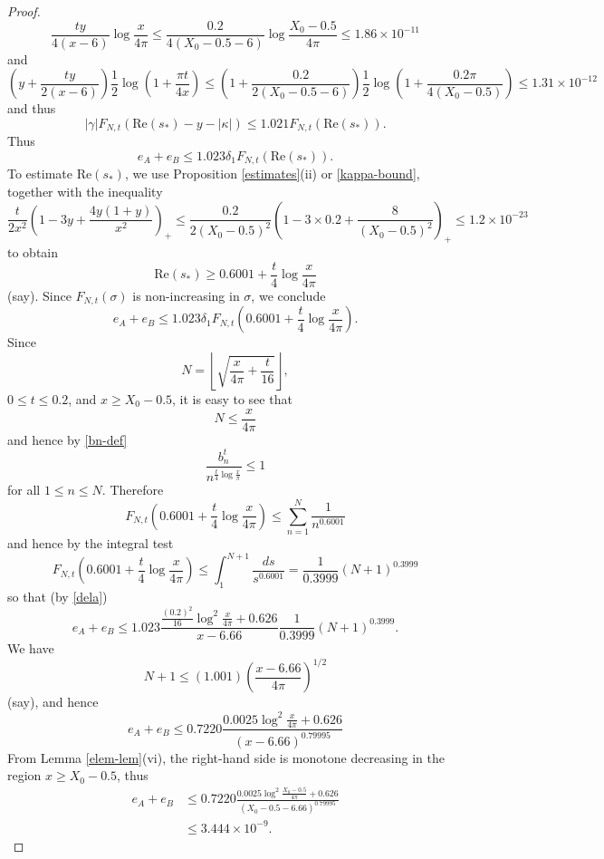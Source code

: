 \begin{proof}
$$ \frac{ty}{4(x-6)} \log \frac{x}{4\pi} \leq \frac{0.2}{4(X_0 - 0.5-6)}\log \frac{X_0 - 0.5}{4\pi} \leq 1.86 \times 10^{-11}$$
and
$$ (y + \frac{ty}{2(x-6)}) \frac{1}{2} \log(1 + \frac{\pi t}{4x}) \leq (1 + \frac{0.2}{2(X_0-0.5-6)}) \frac{1}{2} \log(1 + \frac{0.2 \pi}{4(X_0-0.5)}) \leq 1.31 \times 10^{-12}$$
and thus
\begin{equation}\label{gafn}
 |\gamma| F_{N,t}( \mathrm{Re}(s_*) - y - |\kappa| ) \leq 1.021  F_{N,t}( \mathrm{Re}(s_*) ).
\end{equation}
Thus
$$  e_A + e_B \leq 1.023 \delta_1 F_{N,t}( \mathrm{Re}(s_*) ).$$
To estimate $\mathrm{Re}(s_*)$, we use Proposition \ref{estimates}(ii) or \eqref{kappa-bound}, together with the inequality
$$ \frac{t}{2x^2} \left(1-3y+\frac{4y(1+y)}{x^2}\right)_+ \leq \frac{0.2}{2 (X_0-0.5)^2} \left(1 - 3 \times 0.2 + \frac{8}{(X_0-0.5)^2}\right)_+
\leq 1.2 \times 10^{-23}$$
to obtain 
$$ \mathrm{Re}(s_*) \geq 0.6001 + \frac{t}{4} \log \frac{x}{4\pi}$$
(say).  Since $F_{N,t}(\sigma)$ is non-increasing in $\sigma$, we conclude
$$  e_A + e_B \leq 1.023 \delta_1 F_{N,t}( 0.6001 + \frac{t}{4} \log \frac{x}{4\pi} ).$$
Since
$$ N = \left\lfloor \sqrt{\frac{x}{4\pi} + \frac{t}{16}} \right\rfloor,$$
$0 \leq t \leq 0.2$, and $x \geq X_0-0.5$, it is easy to see that
$$ N \leq \frac{x}{4\pi}$$
and hence by \eqref{bn-def}
$$ \frac{b_n^t}{n^{\frac{t}{4} \log \frac{x}{\pi}}} \leq 1$$
for all $1 \leq n \leq N$.  Therefore
$$ F_{N,t}( 0.6001 + \frac{t}{4} \log \frac{x}{4\pi} ) \leq \sum_{n=1}^N \frac{1}{n^{0.6001}}$$
and hence by the integral test
$$ F_{N,t}( 0.6001 + \frac{t}{4} \log \frac{x}{4\pi} ) \leq \int_1^{N+1} \frac{ds}{s^{0.6001}} = \frac{1}{0.3999} (N+1)^{0.3999} $$
so that (by \eqref{dela})
$$ e_A + e_B \leq 1.023 \frac{\frac{(0.2)^2}{16} \log^2 \frac{x}{4\pi} + 0.626}{x-6.66} \frac{1}{0.3999} (N+1)^{0.3999}.$$
We have
$$ N+1 \leq (1.001) (\frac{x-6.66}{4\pi})^{1/2} $$
(say), and hence
$$ e_A + e_B \leq 0.7220 \frac{0.0025 \log^2 \frac{x}{4\pi} + 0.626}{(x-6.66)^{0.79995}}$$
From Lemma \ref{elem-lem}(vi), the right-hand side is monotone decreasing in the region $x \geq X_0-0.5$, thus
\begin{align*}
 e_A + e_B &\leq 0.7220 \frac{0.0025 \log^2 \frac{X_0-0.5}{4\pi} + 0.626}{(X_0-0.5-6.66)^{0.79995}} \\
&\leq 3.444 \times 10^{-9}.
\end{align*}


\end{proof}

